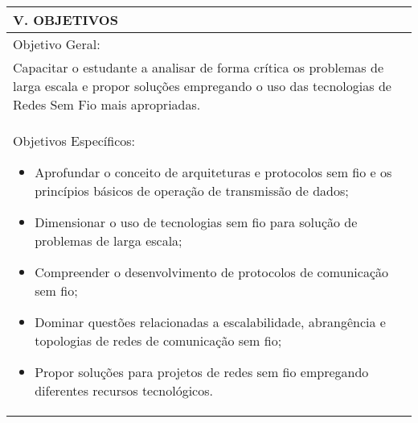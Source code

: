 \documentclass[12pt]{article}
\begin{document}
\begin{longtable}{|L{1.025\textwidth}|} \hline
%
{\bf V. OBJETIVOS } \\ \hline
Objetivo Geral:\\

Capacitar o estudante a analisar de forma crítica os problemas de larga
escala e propor soluções empregando o uso das tecnologias de Redes Sem Fio mais apropriadas. 
\\
Objetivos Específicos:

\begin{itemize}
\item Aprofundar o conceito de arquiteturas e protocolos sem fio e os princípios básicos de operação de transmissão de dados;
\item  Dimensionar o uso de tecnologias sem fio para solução de problemas de larga escala; 
\item  Compreender o desenvolvimento de protocolos de comunicação sem fio;
\item Dominar questões relacionadas a escalabilidade, abrangência e topologias de redes de comunicação sem fio;
\item Propor soluções para projetos de redes sem fio empregando diferentes recursos tecnológicos.
\end{itemize}
\\ \hline
\end{longtable}
\end{document}
